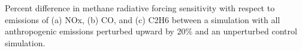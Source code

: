 Percent difference in methane radiative forcing sensitivity with respect to emissions of (a) NOx, (b) CO, and (c) C2H6 between a simulation with all anthropogenic emissions perturbed upward by 20\% and an unperturbed control simulation. ~\label{fig:diffstate}